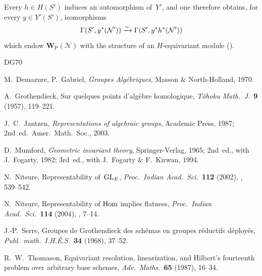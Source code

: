 Every \(h\in H(S')\) induces an automorphism of~\(Y'\), and one therefore
obtains, for every \(y\in Y'(S')\), isomorphisms
\[
\Gamma(S',y^*(\mathcal{N}'))\xrightarrow{\sim}\Gamma(S',y^*h^*(\mathcal{N}'))
\]
which endow \(\mathbf{W}_{\mathrm{P}}(\mathcal{N})\) with the structure of an
\(H\)-equivariant module ().

\makeatletter
\renewcommand{\@bibtitlestyle}{%
  \par\addvspace{1.1\baselineskip}%
  \noindent{\large\bfseries Bibliography}%
  \nde{: additional references cited in this Exposé.}%
  \par\addvspace{0.45\baselineskip}%
}
\makeatother
\begin{thebibliography}{DG70}

M.~Demazure, P.~Gabriel, \emph{Groupes Algébriques}, Masson \&
North-Holland, 1970.

A.~Grothendieck, Sur quelques points d'algèbre homologique, \emph{Tôhoku
Math.\ J.}\ \textbf{9} (1957), 119--221.

J.~C.~Jantzen, \emph{Representations of algebraic groups}, Academic Press,
1987; 2nd~ed.\ Amer.\ Math.\ Soc., 2003.

D.~Mumford, \emph{Geometric invariant theory}, Springer-Verlag, 1965;
2nd~ed., with J.~Fogarty, 1982; 3rd~ed., with J.~Fogarty \& F.~Kirwan, 1994.

N.~Nitsure, Representability of~\(\operatorname{GL}_E\), \emph{Proc.\ Indian Acad.\ Sci.}\
\textbf{112} (2002), , 539--542.

N.~Nitsure, Representability of \(\operatorname{Hom}\) implies flatness, \emph{Proc.\
Indian Acad.\ Sci.}\ \textbf{114} (2004), , 7--14.

J.-P.~Serre, Groupes de Grothendieck des schémas en groupes réductifs
déployés, \emph{Publ.\ math.\ I.H.É.S.}\ \textbf{34} (1968), 37--52.

\bibitem[Th87]{Th87}
R.~W.~Thomason, Equivariant resolution, linearization, and Hilbert's
fourteenth problem over arbitrary base schemes, \emph{Adv.\ Maths.}\
\textbf{65} (1987), 16--34.

\end{thebibliography}
